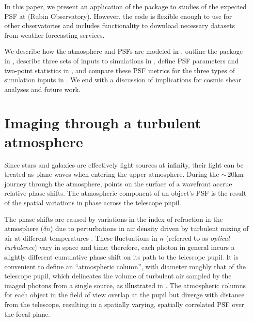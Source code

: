 \documentclass[twocolumn]{aastex631}
\begin{document}
In this paper, we present an application of the \psfws package to studies of the expected PSF at \cp (Rubin Observatory). 
However, the code is flexible enough to use for other observatories and includes functionality to download necessary datasets from weather forecasting services.

We describe how the atmosphere and PSFs are modeled in , outline the \psfws package in , describe three sets of inputs to simulations in , define PSF parameters and two-point statistics in , and compare these PSF metrics for the three types of simulation inputs in .
We end with a discussion of implications for cosmic shear analyses and future work. 


\section{Imaging through a turbulent atmosphere} \label{sec:atmos}
Since stars and galaxies are effectively light sources at infinity, their light can be treated as plane waves when entering the upper atmosphere. 
During the $\sim\,$20\unit{km} journey through the atmosphere, points on the surface of a wavefront accrue relative phase shifts.
The atmospheric component of an object's PSF is the result of the spatial variations in phase across the telescope pupil.

The phase shifts are caused by variations in the index of refraction in the atmosphere ($\delta n$) due to perturbations in air density driven by turbulent mixing of air at different temperatures  \citep{lawrence_survey_1970, clifford_classical_1978}.
These fluctuations in $n$ (referred to as \textit{optical turbulence}) vary in space and time; therefore, each photon in general incurs a slightly different cumulative phase shift on its path to the telescope pupil.
It is convenient to define an ``atmospheric column'', with diameter roughly that of the telescope pupil, which delineates the volume of turbulent air sampled by the imaged photons from a single source, as illustrated in . 
The atmospheric columns for each object in the field of view overlap at the pupil but diverge with distance from the telescope, resulting in a spatially varying, spatially correlated PSF over the focal plane. 
\end{document}
